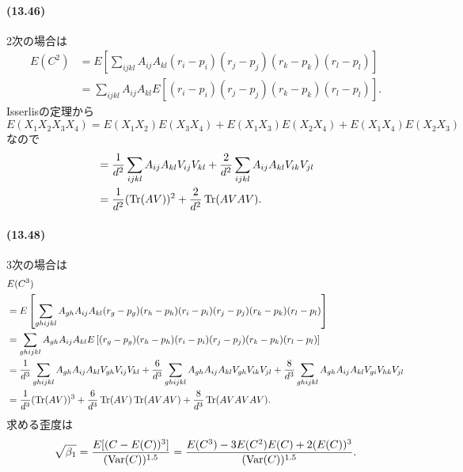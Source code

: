 \paragraph{(13.46)}
2次の場合は
\begin{align*}
  E(C^2) &= E \left[ \sum_{ijkl} A_{ij} A_{kl} (r_i-p_i) (r_j-p_j) (r_k-p_k) (r_l-p_l) \right] \\
  &= \sum_{ijkl} A_{ij} A_{kl} E \left[ (r_i-p_i) (r_j-p_j) (r_k-p_k) (r_l-p_l) \right] .
\end{align*}
Isserlisの定理から
\[ E(X_1X_2X_3X_4) = E(X_1X_2) E(X_3X_4) + E(X_1X_3) E(X_2X_4) + E(X_1X_4) E(X_2X_3) \]
なので
\begin{align*}
  &= \frac{1}{d^2} \sum_{ijkl} A_{ij} A_{kl} V_{ij} V_{kl}
  + \frac{2}{d^2} \sum_{ijkl} A_{ij} A_{kl} V_{ik} V_{jl} \\
  &= \frac{1}{d^2} (\operatorname{Tr}(AV))^2 + \frac{2}{d^2} \operatorname{Tr}(AVAV) .
\end{align*}

\paragraph{(13.48)}
3次の場合は
\begin{align*}
  & E(C^3) \\
  &= E \left[ \sum_{ghijkl} A_{gh} A_{ij} A_{kl} (r_g-p_g) (r_h-p_h) (r_i-p_i) (r_j-p_j) (r_k-p_k) (r_l-p_l) \right] \\
  &= \sum_{ghijkl} A_{gh} A_{ij} A_{kl} E \left[ (r_g-p_g) (r_h-p_h) (r_i-p_i) (r_j-p_j) (r_k-p_k) (r_l-p_l) \right] \\
  &= \frac{1}{d^3} \sum_{ghijkl} A_{gh} A_{ij} A_{kl} V_{gh} V_{ij} V_{kl}
  + \frac{6}{d^3} \sum_{ghijkl} A_{gh} A_{ij} A_{kl} V_{gh} V_{ik} V_{jl}
  + \frac{8}{d^3} \sum_{ghijkl} A_{gh} A_{ij} A_{kl} V_{gi} V_{hk} V_{jl} \\
  &= \frac{1}{d^3} (\operatorname{Tr}(AV))^3 + \frac{6}{d^3} \operatorname{Tr}(AV) \operatorname{Tr}(AVAV) + \frac{8}{d^3} \operatorname{Tr}(AVAVAV) .
\end{align*}
求める歪度は
\[
\sqrt{\beta_1} = \frac{E[(C-E(C))^3]}{(\operatorname{Var}(C))^{1.5}}
= \frac{E(C^3) - 3 E(C^2)E(C) + 2(E(C))^3}{(\operatorname{Var}(C))^{1.5}} .
\]
